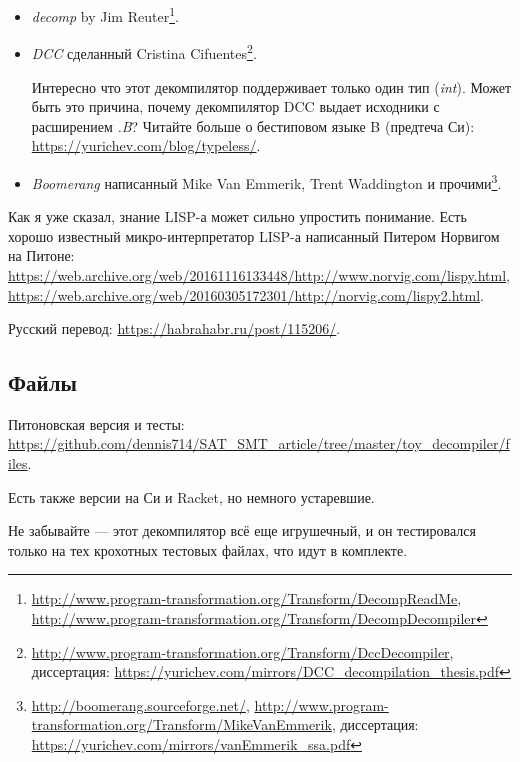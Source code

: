 \begin{itemize}
	\item \textit{decomp} by Jim Reuter\footnote{
			\url{http://www.program-transformation.org/Transform/DecompReadMe},
			\url{http://www.program-transformation.org/Transform/DecompDecompiler}}.

	\item \textit{DCC} сделанный Cristina Cifuentes\footnote{
			\url{http://www.program-transformation.org/Transform/DccDecompiler},
			диссертация: \url{https://yurichev.com/mirrors/DCC_decompilation_thesis.pdf}}.

		Интересно что этот декомпилятор поддерживает только один тип (\textit{int}).
		Может быть это причина, почему декомпилятор DCC выдает исходники с расширением \textit{.B}?
		Читайте больше о бестиповом языке B (предтеча Си): \url{https://yurichev.com/blog/typeless/}.

	\item \textit{Boomerang} написанный Mike Van Emmerik, Trent Waddington и прочими\footnote{
			\url{http://boomerang.sourceforge.net/},
			\url{http://www.program-transformation.org/Transform/MikeVanEmmerik},
			диссертация: \url{https://yurichev.com/mirrors/vanEmmerik_ssa.pdf}}.
\end{itemize}

Как я уже сказал, знание LISP-а может сильно упростить понимание.
Есть хорошо известный микро-интерпретатор LISP-а написанный Питером Норвигом на Питоне:
\url{https://web.archive.org/web/20161116133448/http://www.norvig.com/lispy.html},
\url{https://web.archive.org/web/20160305172301/http://norvig.com/lispy2.html}.

Русский перевод: \url{https://habrahabr.ru/post/115206/}.

\subsection{Файлы}

Питоновская версия и тесты: \url{https://github.com/dennis714/SAT_SMT_article/tree/master/toy_decompiler/files}.

Есть также версии на Си и Racket, но немного устаревшие.

Не забывайте --- этот декомпилятор всё еще игрушечный, и он тестировался только на тех крохотных тестовых файлах,
что идут в комплекте.

